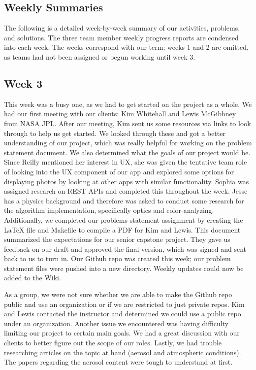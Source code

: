 \documentclass[onecolumn, draftclsnofoot,10pt, compsoc]{IEEEtran}
\begin{document}
\begin{flushleft}
\section{Weekly Summaries}
The following is a detailed week-by-week summary of our activities, problems, and solutions. The three team member weekly progress reports are condensed into each week. The weeks correspond with our term; weeks 1 and 2 are omitted, as teams had not been assigned or begun working until week 3.
\subsection{Week 3}
This week was a busy one, as we had to get started on the project as a whole. We had our first meeting with our clients: Kim Whitehall and Lewis McGibbney from NASA JPL. After our meeting, Kim sent us some resources via links to look through to help us get started. We looked through these and got a better understanding of our project, which was really helpful for working on the problem statement document. We also determined what the goals of our project would be. 
Since Reilly mentioned her interest in UX, she was given the tentative team role of looking into the UX component of our app and explored some options for displaying photos by looking at other apps with similar functionality. Sophia was assigned research on REST APIs and completed this throughout the week. Jesse has a physics background and therefore was asked to conduct some research for the algorithm implementation, specifically optics and color-analyzing.
Additionally, we completed our problems statement assignment by creating the LaTeX file and Makefile to compile a PDF for Kim and Lewis. This document summarized the expectations for our senior capstone project. They gave us feedback on our draft and approved the final version, which was signed and sent back to us to turn in.
Our Github repo was created this week; our problem statement files were pushed into a new directory. Weekly updates could now be added to the Wiki.

\medskip

As a group, we were not sure whether we are able to make the Github repo public and use an organization or if we are restricted to just private repos. Kim and Lewis contacted the instructor and determined we could use a public repo under an organization.
Another issue we encountered was having difficulty limiting our project to certain main goals. We had a great discussion with our clients to better figure out the scope of our roles. 
Lastly, we had trouble researching articles on the topic at hand (aerosol and atmospheric conditions). The papers regarding the aerosol content were tough to understand at first. 


\end{flushleft}
\end{document}
